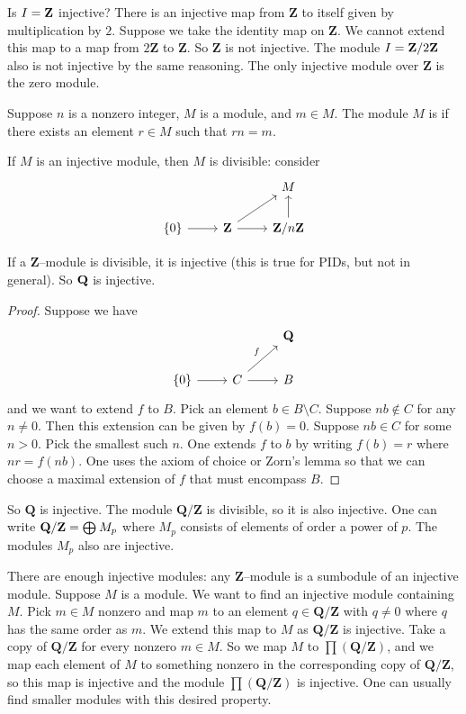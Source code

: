 \documentclass[11pt, oneside,margin=1in]{article}
\begin{document}
\begin{example}[Injective modules over $R=\Z$]\label{}
Is $I=\mathbf Z$ injective? There is an injective map from $\mathbf{Z}$ to itself given by multiplication by $2$. Suppose we take the identity map on $\mathbf{Z}$. We cannot extend this map to a map from $2\mathbf{Z}$ to $\mathbf{Z}$. So $\mathbf{Z}$ is not injective. The module $I=\mathbf Z / 2\mathbf Z$ also is not injective by the same reasoning. The only injective module over $\mathbf{Z}$ is the zero module.
\end{example}

\begin{definition}[ ]\label{}
Suppose $n$ is a nonzero integer, $M$ is a module, and $m\in M$. The module $M$ is  if there exists an element $r\in M$ such that $rn=m$.
\end{definition}

If $M$ is an injective module, then $M$ is divisible: consider
\[
\begin{tikzcd}
	&&M\\
	\{0\} \arrow[r] & \mathbf{Z} \arrow[ur] \arrow[r] & \Zmod n \arrow[u]
\end{tikzcd}
\]

If a $\mathbf{Z}$--module is divisible, it is injective (this is true for PIDs, but not in general). So $\mathbf Q$ is injective. 
\begin{proof}
Suppose we have 
\[
\begin{tikzcd}
	&& \mathbf{Q}\\
	\{0\} \arrow[r] & C \arrow[r] \arrow[ru, "f"] & B
\end{tikzcd}
\]
and we want to extend $f$ to $B$. Pick an element $b\in B\setminus C$. Suppose $nb\notin C$ for any $n\ne 0$. Then this extension can be given by $f(b)=0$. Suppose $nb\in C$ for some $n>0$. Pick the smallest such $n$. One extends $f$ to $b$ by writing $f(b) =r$ where $nr = f(nb)$. One uses the axiom of choice or Zorn's lemma so that we can choose a maximal extension of $f$ that must encompass $B$.  
\end{proof}

So $\mathbf{Q}$ is injective. The module $\mathbf{Q}/\mathbf{Z}$ is divisible, so it is also injective. One can write $\mathbf Q/\mathbf Z = \bigoplus_{} M_p$ where $M_p$ consists of elements of order a power of $p$. The modules $M_p$ also are injective. 

There are enough injective modules: any $\mathbf{Z}$--module is a sumbodule of an injective module. Suppose $M$ is a module. We want to find an injective module containing $M$. Pick $m\in M$ nonzero and map $m$ to an element $q\in \mathbf{Q}/\mathbf{Z}$ with $q\ne 0$ where $q$ has the same order as $m$. We extend this map to $M$ as $\mathbf{Q}/\mathbf{Z}$ is injective. Take a copy of $\mathbf{Q}/\mathbf{Z}$ for every nonzero $m\in M$. So we map $M$ to $\prod (\mathbf{Q}/\mathbf{Z})$, and we map each element of $M$ to something nonzero in the corresponding copy of $\mathbf{Q}/\mathbf{Z}$, so this map is injective and the module $\prod (\mathbf{Q}/\mathbf{Z})$ is injective. One can usually find smaller modules with this desired property.
\end{document}
